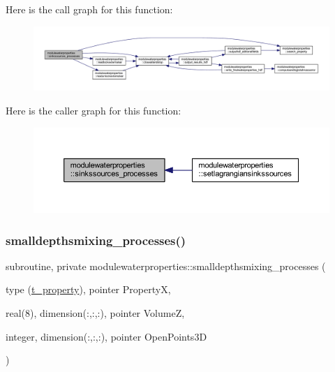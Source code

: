 Here is the call graph for this function\+:\nopagebreak
\begin{figure}[H]
\begin{center}
\leavevmode
\includegraphics[width=350pt]{namespacemodulewaterproperties_a10d63582cfbe1d7e4a4c18ad2b27ffc5_cgraph}
\end{center}
\end{figure}
Here is the caller graph for this function\+:\nopagebreak
\begin{figure}[H]
\begin{center}
\leavevmode
\includegraphics[width=350pt]{namespacemodulewaterproperties_a10d63582cfbe1d7e4a4c18ad2b27ffc5_icgraph}
\end{center}
\end{figure}
\mbox{\label{namespacemodulewaterproperties_ad38f0837c272b87901bd3963788eb9e9}} 
\subsubsection{\texorpdfstring{smalldepthsmixing\+\_\+processes()}{smalldepthsmixing\_processes()}}
{\footnotesize\ttfamily subroutine, private modulewaterproperties\+::smalldepthsmixing\+\_\+processes (\begin{DoxyParamCaption}\item[{type (\mbox{\hyperlink{structmodulewaterproperties_1_1t__property}{t\+\_\+property}}), pointer}]{PropertyX,  }\item[{real(8), dimension(\+:,\+:,\+:), pointer}]{VolumeZ,  }\item[{integer, dimension(\+:,\+:,\+:), pointer}]{Open\+Points3D }\end{DoxyParamCaption})\hspace{0.3cm}{\ttfamily [private]}}

